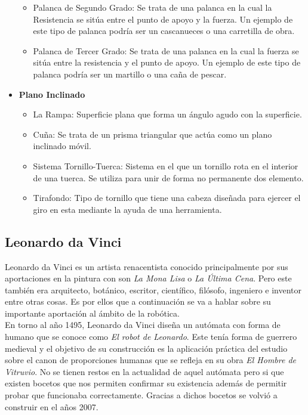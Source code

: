 \begin{itemize}
\begin{itemize}
\item Palanca de Segundo Grado: Se trata de una palanca en la cual la Resistencia se sitúa entre el punto de apoyo y la fuerza. Un ejemplo de este tipo de palanca podría ser un cascanueces o una carretilla de obra.

\item Palanca de Tercer Grado: Se trata de una palanca en la cual la fuerza se sitúa entre la resistencia y el punto de apoyo. Un ejemplo de este tipo de palanca podría ser un martillo o una caña de pescar.

\end{itemize}

\item \textbf{Plano Inclinado}

\begin{itemize}
\item La Rampa: Superficie plana que forma un ángulo agudo con la superficie.

\item Cuña: Se trata de un prisma triangular que actúa como un plano inclinado móvil.

\item Sistema Tornillo-Tuerca: Sistema en el que un tornillo rota en el interior de una tuerca. Se utiliza para unir de forma no permanente dos elemento.

\item Tirafondo: Tipo de tornillo que tiene una cabeza diseñada para ejercer el giro en esta mediante la ayuda de una herramienta.

\end{itemize}

\end{itemize}

\subsection{Leonardo da Vinci}


Leonardo da Vinci es un artista renacentista conocido principalmente por sus aportaciones en la pintura con son \textit{La Mona Lisa} o \textit{La Última Cena}. Pero este también era arquitecto, botánico, escritor, científico, filósofo, ingeniero e inventor entre otras cosas. Es por ellos que a continuación se va a hablar sobre su importante aportación al ámbito de la robótica.\\

En torno al año 1495, Leonardo da Vinci diseña un autómata con forma de humano que se conoce como \textit{El robot de Leonardo}. Este tenía forma de guerrero medieval y el objetivo de su construcción es la aplicación práctica del estudio sobre el canon de proporciones humanas que se refleja en su obra \textit{El Hombre de Vitruvio}. No se tienen restos en la actualidad de aquel autómata pero si que existen bocetos que nos permiten confirmar su existencia además de permitir probar que funcionaba correctamente. Gracias a dichos bocetos se volvió a construir en el años 2007.\\

